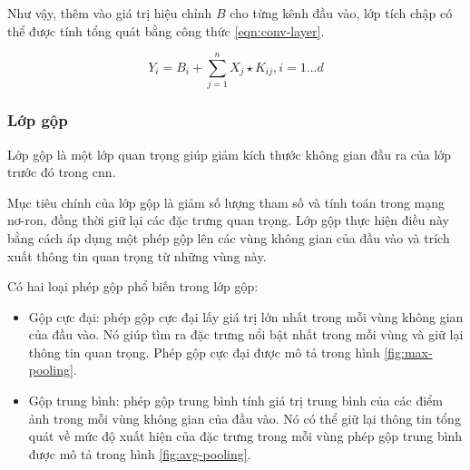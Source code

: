 Như vậy, thêm vào giá trị hiệu chỉnh $B$ cho từng kênh đầu vào, lớp tích chập có thể được tính tổng quát bằng công thức \ref{eqn:conv-layer}.

\begin{equation}\label{eqn:conv-layer}
	Y_i = B_i + \sum^n_{j=1}X_j \star K_{ij}, i = 1...d 
\end{equation}

\subsubsection{Lớp gộp}
Lớp gộp là một lớp quan trọng giúp giảm kích thước không gian đầu ra của lớp trước đó trong \acrshort{cnn}. 

Mục tiêu chính của lớp gộp là giảm số lượng tham số và tính toán trong mạng nơ-ron, đồng thời giữ lại các đặc trưng quan trọng. Lớp gộp thực hiện điều này bằng cách áp dụng một phép gộp lên các vùng không gian của đầu vào và trích xuất thông tin quan trọng từ những vùng này.

Có hai loại phép gộp phổ biến trong lớp gộp:

\begin{itemize}
	\item Gộp cực đại: phép gộp cực đại lấy giá trị lớn nhất trong mỗi vùng không gian của đầu vào. Nó giúp tìm ra đặc trưng nổi bật nhất trong mỗi vùng và giữ lại thông tin quan trọng. Phép gộp cực đại được mô tả trong hình \ref{fig:max-pooling}.
	\item Gộp trung bình: phép gộp trung bình tính giá trị trung bình của các điểm ảnh trong mỗi vùng không gian của đầu vào. Nó có thể giữ lại thông tin tổng quát về mức độ xuất hiện của đặc trưng trong mỗi vùng phép gộp trung bình được mô tả trong hình \ref{fig:avg-pooling}.
\end{itemize}



